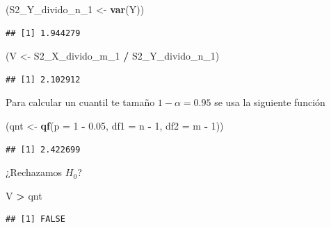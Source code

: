 \documentclass[
  12pt,
]{book}
\newenvironment{Shaded}{\begin{snugshade}}{\end{snugshade}}
\newcommand{\DataTypeTok}[1]{\textcolor[rgb]{0.13,0.29,0.53}{#1}}
\newcommand{\DecValTok}[1]{\textcolor[rgb]{0.00,0.00,0.81}{#1}}
\newcommand{\FloatTok}[1]{\textcolor[rgb]{0.00,0.00,0.81}{#1}}
\newcommand{\KeywordTok}[1]{\textcolor[rgb]{0.13,0.29,0.53}{\textbf{#1}}}
\newcommand{\NormalTok}[1]{#1}
\newcommand{\OperatorTok}[1]{\textcolor[rgb]{0.81,0.36,0.00}{\textbf{#1}}}
\newcommand{\StringTok}[1]{\textcolor[rgb]{0.31,0.60,0.02}{#1}}
\begin{document}
\begin{Shaded}
\begin{Highlighting}[]
\NormalTok{(S2\_Y\_divido\_n\_}\DecValTok{1}\NormalTok{ \textless{}{-}}\StringTok{ }\KeywordTok{var}\NormalTok{(Y))}
\end{Highlighting}
\end{Shaded}

\begin{verbatim}
## [1] 1.944279
\end{verbatim}

\begin{Shaded}
\begin{Highlighting}[]
\NormalTok{(V \textless{}{-}}\StringTok{ }\NormalTok{S2\_X\_divido\_m\_}\DecValTok{1} \OperatorTok{/}\StringTok{ }\NormalTok{S2\_Y\_divido\_n\_}\DecValTok{1}\NormalTok{)}
\end{Highlighting}
\end{Shaded}

\begin{verbatim}
## [1] 2.102912
\end{verbatim}

Para calcular un cuantil te tamaño \(1-\alpha = 0.95\) se usa la siguiente función

\begin{Shaded}
\begin{Highlighting}[]
\NormalTok{(qnt \textless{}{-}}\StringTok{ }\KeywordTok{qf}\NormalTok{(}\DataTypeTok{p =} \DecValTok{1} \OperatorTok{{-}}\StringTok{ }\FloatTok{0.05}\NormalTok{, }\DataTypeTok{df1 =}\NormalTok{ n }\OperatorTok{{-}}\StringTok{ }\DecValTok{1}\NormalTok{, }\DataTypeTok{df2 =}\NormalTok{ m }\OperatorTok{{-}}\StringTok{ }\DecValTok{1}\NormalTok{))}
\end{Highlighting}
\end{Shaded}

\begin{verbatim}
## [1] 2.422699
\end{verbatim}

¿Rechazamos \(H_0\)?

\begin{Shaded}
\begin{Highlighting}[]
\NormalTok{V }\OperatorTok{\textgreater{}}\StringTok{ }\NormalTok{qnt}
\end{Highlighting}
\end{Shaded}

\begin{verbatim}
## [1] FALSE
\end{verbatim}
\end{document}
